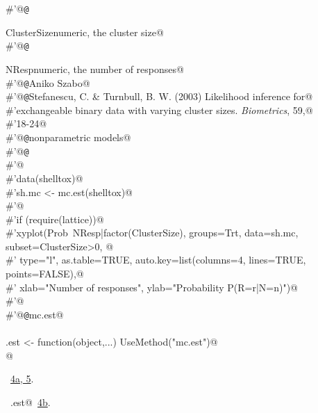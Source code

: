 \documentclass[reqno]{amsart}
\renewcommand{\NWlink}[2]{\hyperlink{#1}{#2}}
\begin{document}
\begin{flushleft}
\begin{minipage}{\linewidth}
\begin{list}{}{}
\mbox{}\verb@#'@{\tt @}\verb@return \item{ClusterSize}{numeric, the cluster size}@\\
\mbox{}\verb@#'@{\tt @}\verb@return \item{NResp}{numeric, the number of responses}@\\
\mbox{}\verb@#'@{\tt @}\verb@author Aniko Szabo@\\
\mbox{}\verb@#'@{\tt @}\verb@references Stefanescu, C. & Turnbull, B. W. (2003) Likelihood inference for@\\
\mbox{}\verb@#'exchangeable binary data with varying cluster sizes.  \emph{Biometrics}, 59,@\\
\mbox{}\verb@#'18-24@\\
\mbox{}\verb@#'@{\tt @}\verb@keywords nonparametric models@\\
\mbox{}\verb@#'@{\tt @}\verb@examples@\\
\mbox{}\verb@#'@\\
\mbox{}\verb@#'data(shelltox)@\\
\mbox{}\verb@#'sh.mc <- mc.est(shelltox)@\\
\mbox{}\verb@#'@\\
\mbox{}\verb@#'if (require(lattice)){@\\
\mbox{}\verb@#'xyplot(Prob~NResp|factor(ClusterSize), groups=Trt, data=sh.mc, subset=ClusterSize>0, @\\
\mbox{}\verb@#'    type="l", as.table=TRUE, auto.key=list(columns=4, lines=TRUE, points=FALSE),@\\
\mbox{}\verb@#'    xlab="Number of responses", ylab="Probability P(R=r|N=n)")@\\
\mbox{}\verb@#'}@\\
\mbox{}\verb@#'@{\tt @}\verb@name mc.est@\\
\mbox{}\verb@@\\
\mbox{}\verb@mc.est <- function(object,...) UseMethod("mc.est")@\\
\mbox{}\verb@ @\\
\mbox{}\verb@@{\NWsep}
\end{list}
\vspace{-1.5ex}
\footnotesize
\begin{list}{}{\setlength{\itemsep}{-\parsep}\setlength{\itemindent}{-\leftmargin}}
\item \NWtxtFileDefBy\ \NWlink{nuweb4a}{4a}\NWlink{nuweb5}{, 5}.
\item \NWtxtIdentsUsed\nobreak\  \verb@mc.est@\nobreak\ \NWlink{nuweb4b}{4b}.
\item{}
\end{list}
\end{minipage}\vspace{4ex}
\end{flushleft}
\end{document}

